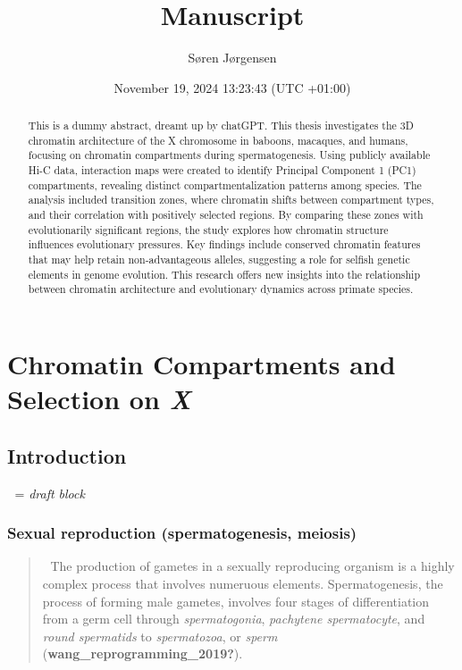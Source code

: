 \documentclass[
  a4paper,
  DIV=11,
  numbers=noendperiod]{scrarticle}
\title{Manuscript}
\author{Søren Jørgensen}
\date{November 19, 2024 13:23:43 (UTC +01:00)}
\renewcommand*\contentsname{Table of contents}
\newcommand\contentsname{Table of contents}
\begin{document}
\maketitle
\begin{abstract}
This is a dummy abstract, dreamt up by chatGPT. This thesis investigates
the 3D chromatin architecture of the X chromosome in baboons, macaques,
and humans, focusing on chromatin compartments during spermatogenesis.
Using publicly available Hi-C data, interaction maps were created to
identify Principal Component 1 (PC1) compartments, revealing distinct
compartmentalization patterns among species. The analysis included
transition zones, where chromatin shifts between compartment types, and
their correlation with positively selected regions. By comparing these
zones with evolutionarily significant regions, the study explores how
chromatin structure influences evolutionary pressures. Key findings
include conserved chromatin features that may help retain
non-advantageous alleles, suggesting a role for selfish genetic elements
in genome evolution. This research offers new insights into the
relationship between chromatin architecture and evolutionary dynamics
across primate species.
\end{abstract}

\renewcommand*\contentsname{Table of contents}
{
\hypersetup{linkcolor=}
\setcounter{tocdepth}{2}
\tableofcontents
}

\section{\texorpdfstring{Chromatin Compartments and Selection on
\emph{X}}{Chromatin Compartments and Selection on X}}\label{chromatin-compartments-and-selection-on-x}

\subsection{Introduction}\label{introduction}

{📝} = \emph{draft block}

\subsubsection{Sexual reproduction (spermatogenesis,
meiosis)}\label{sexual-reproduction-spermatogenesis-meiosis}

\begin{quote}
{📝} The production of gametes in a sexually reproducing organism is a
highly complex process that involves numeruous elements.
Spermatogenesis, the process of forming male gametes, involves four
stages of differentiation from a germ cell through \emph{spermatogonia},
\emph{pachytene spermatocyte}, and \emph{round spermatids} to
\emph{spermatozoa}, or \emph{sperm}
(\textbf{wang\_reprogramming\_2019?}).
\end{quote}
\end{document}
